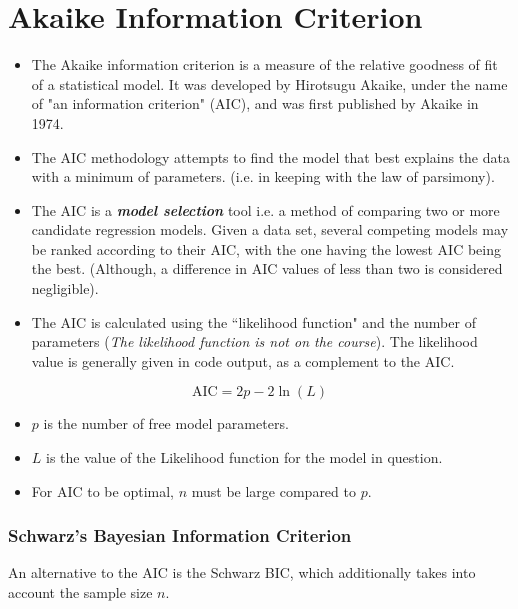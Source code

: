 \section*{Akaike Information Criterion}
\begin{itemize}
	\item The Akaike information criterion is a measure of the relative goodness of fit of a statistical model. It was developed by Hirotsugu Akaike, under the name of "an information criterion" (AIC), and was first published by Akaike in 1974.
	\item 
	The AIC methodology attempts to find the model that best explains the data with a minimum of parameters. (i.e. in keeping with the law of parsimony).
	\item The AIC is a \textbf{\textit{model selection}} tool i.e. a method of comparing two
	or more candidate regression models. Given a data set, several competing models may be ranked according to their AIC, with the one having the lowest AIC being the best. (Although, a difference in AIC values of less than two is considered negligible).
	\item	
	The AIC is calculated using the ``likelihood function" and the number of parameters (\textit{The likelihood function is not on the course}). The likelihood value is generally given in code output, as a complement to the AIC.
\end{itemize}




\[\mbox{AIC} = 2p - 2\ln(L)\]

\begin{itemize}
	\item $p$ is the number of free model parameters.
	\item $L$ is the value of the Likelihood function for the model in question.
	\item For AIC to be optimal, $n$ must be large compared to $p$.\\
\end{itemize}
\subsubsection*{Schwarz's Bayesian Information Criterion}
An alternative to the AIC is the Schwarz BIC, which additionally takes into account the sample size $n$.

